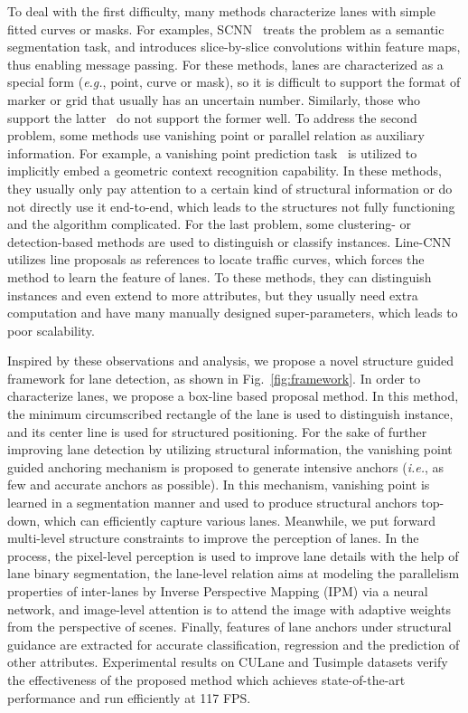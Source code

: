 \documentclass{article}
\def\ie{\emph{i.e.}}
\def\eg{\emph{e.g.}}
\begin{document}
To deal with the first difficulty, many methods characterize lanes with simple fitted curves or masks. For examples, 
SCNN~\cite{pan2018spatial} treats the problem as a semantic segmentation task, and introduces slice-by-slice convolutions within feature maps, thus enabling message passing. For these methods, lanes are characterized as a special form (\eg, point, curve or mask), so it is difficult to support the format of marker or grid that usually has an uncertain number. Similarly, those who support the latter~\cite{lee2017vpgnet} do not support the former well.
To address the second problem, some methods use vanishing point or parallel relation as auxiliary information. For example, a vanishing point prediction task~\cite{lee2017vpgnet} is utilized to implicitly embed a geometric context recognition capability.
In these methods, they usually only pay attention to a certain kind of structural information or do not directly use it end-to-end, which leads to the structures not fully functioning and the algorithm complicated. 
For the last problem, some clustering- or detection-based methods are used to distinguish or classify instances. 
Line-CNN~\cite{li2019line} utilizes line proposals as references to locate traffic curves, which forces the method to learn the feature of lanes. 
To these methods, they can distinguish instances and even extend to more attributes, but they usually need extra computation and have many manually designed super-parameters, which leads to poor scalability.

Inspired by these observations and analysis, we propose a novel structure guided framework for lane detection, as shown in Fig.~\ref{fig:framework}. In order to characterize lanes, we propose a box-line based proposal method. In this method, the minimum circumscribed rectangle of the lane is used to distinguish instance, and its center line is used for structured positioning. 
For the sake of further improving lane detection by utilizing structural information, the vanishing point guided anchoring mechanism is proposed to generate intensive anchors (\ie, as few and accurate anchors as possible). In this mechanism, vanishing point is learned in a segmentation manner and used to produce structural anchors top-down, which can efficiently capture various lanes. Meanwhile, we put forward multi-level structure constraints to improve the perception of lanes. In the process, the pixel-level perception is used to improve lane details with the help of lane binary segmentation, the lane-level relation aims at modeling the parallelism properties of inter-lanes by Inverse Perspective Mapping (IPM) via a neural network, and image-level attention is to attend the image with adaptive weights from the perspective of scenes. Finally, features of lane anchors under structural guidance are extracted for accurate classification, regression and the prediction of other attributes. 
Experimental results on CULane and Tusimple datasets verify the effectiveness of the proposed method which achieves state-of-the-art performance and run efficiently at 117 FPS.
\end{document}
